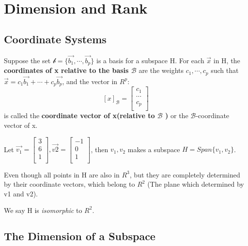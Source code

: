 \section{Dimension and Rank}

\subsection{Coordinate Systems}

\begin{definition}
    Suppose the set \(\mathcal{b} = \{\vec{b_1}, \cdots, \vec{b_p} \}\) is a basis for a subspace H. For each \(\vec{x} \) in H, the \textbf{coordinates of x relative to the basis \(\mathcal{B}\) } are the weights \(c_1, \cdots, c_p\)  such that \(\vec{x}  = c_1 \vec{b_1} + \cdots + c_p \vec{b_p} \), and the vector in \(R^p\):
    \[
        [x]_{\mathcal{B}} = \begin{bmatrix}
             c_1 \\
             \cdots \\
             c_p \\
        \end{bmatrix}
    \]    
    is called the \textbf{coordinate vector of x(relative to \(\mathcal{B}\) )} or the \(\mathcal{B}\)-coordinate vector of x.  
\end{definition}

\begin{eg}
   Let \(\vec{v_1}  = \begin{bmatrix}
     3 \\
     6 \\
     1 \\
   \end{bmatrix}, \vec{v2} = \begin{bmatrix}
     -1 \\
     0 \\
     1 \\
   \end{bmatrix}\), then \(v_1, v_2\) makes a subspace \(H = Span\{v_1, v_2\}\).  

   Even though all points in H are also in \(R^3\), but they are completely determined by their coordinate vectors, which belong to \(R^2\) (The plane which determined by v1 and v2).  

   We say H is \textit{isomorphic} to \(R^2\). 
\end{eg}

\subsection{The Dimension of a Subspace}

